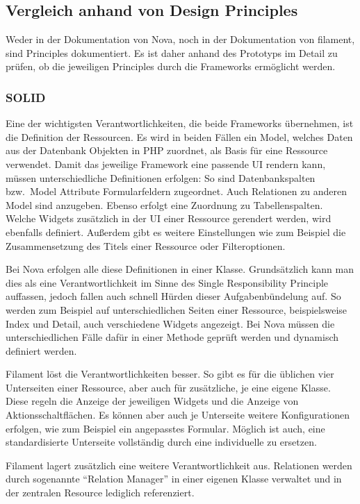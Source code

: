\subsection{Vergleich anhand von Design Principles}
Weder in der Dokumentation von Nova, noch in der Dokumentation von filament, sind Principles dokumentiert.
Es ist daher anhand des Prototyps im Detail zu prüfen, ob die jeweiligen Principles durch die Frameworks ermöglicht werden.

\subsubsection{SOLID}
Eine der wichtigsten Verantwortlichkeiten, die beide Frameworks übernehmen, ist die Definition der Ressourcen.
Es wird in beiden Fällen ein Model, welches Daten aus der Datenbank Objekten in PHP zuordnet, als Basis für eine Ressource verwendet.
Damit das jeweilige Framework eine passende UI rendern kann, müssen unterschiedliche Definitionen erfolgen:
So sind Datenbankspalten bzw.~Model Attribute Formularfeldern zugeordnet.
Auch Relationen zu anderen Model sind anzugeben.
Ebenso erfolgt eine Zuordnung zu Tabellenspalten.
Welche Widgets zusätzlich in der UI einer Ressource gerendert werden, wird ebenfalls definiert.
Außerdem gibt es weitere Einstellungen wie zum Beispiel die Zusammensetzung des Titels einer Ressource oder Filteroptionen.

Bei Nova erfolgen alle diese Definitionen in einer Klasse.
Grundsätzlich kann man dies als eine Verantwortlichkeit im Sinne des Single Responsibility Principle auffassen, jedoch fallen auch schnell Hürden dieser Aufgabenbündelung auf.
So werden zum Beispiel auf unterschiedlichen Seiten einer Ressource, beispielsweise Index und Detail, auch verschiedene Widgets angezeigt.
Bei Nova müssen die unterschiedlichen Fälle dafür in einer Methode geprüft werden und dynamisch definiert werden.

Filament löst die Verantwortlichkeiten besser.
So gibt es für die üblichen vier Unterseiten einer Ressource, aber auch für zusätzliche, je eine eigene Klasse.
Diese regeln die Anzeige der jeweiligen Widgets und die Anzeige von Aktionsschaltflächen.
Es können aber auch je Unterseite weitere Konfigurationen erfolgen, wie zum Beispiel ein angepasstes Formular.
Möglich ist auch, eine standardisierte Unterseite vollständig durch eine individuelle zu ersetzen.

Filament lagert zusätzlich eine weitere Verantwortlichkeit aus.
Relationen werden durch sogenannte \enquote{Relation Manager} in einer eigenen Klasse verwaltet und in der zentralen Resource lediglich referenziert.

